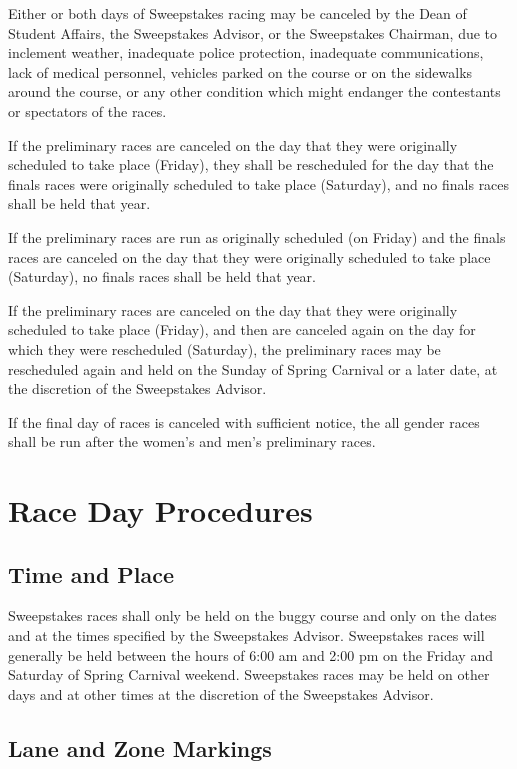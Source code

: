	Either or both days of Sweepstakes racing may be canceled by the Dean of Student Affairs, the Sweepstakes Advisor, or the Sweepstakes Chairman, due to inclement weather, inadequate police protection, inadequate communications, lack of medical personnel, vehicles parked on the course or on the sidewalks around the course, or any other condition which might endanger the contestants or spectators of the races.

	If the preliminary races are canceled on the day that they were originally scheduled to take place (Friday), they shall be rescheduled for the day that the finals races were originally scheduled to take place (Saturday), and no finals races shall be held that year.

	If the preliminary races are run as originally scheduled (on Friday) and the finals races are canceled on the day that they were originally scheduled to take place (Saturday), no finals races shall be held that year.

	If the preliminary races are canceled on the day that they were originally scheduled to take place (Friday), and then are canceled again on the day for which they were rescheduled (Saturday), the preliminary races may be rescheduled again and held on the Sunday of Spring Carnival or a later date, at the discretion of the Sweepstakes Advisor.

	If the final day of races is canceled with sufficient notice, the all gender races shall be run after the women's and men's preliminary races.

\section{Race Day Procedures}

\subsection{Time and Place}

	Sweepstakes races shall only be held on the buggy course and only on the dates and at the times specified by the Sweepstakes Advisor. Sweepstakes races will generally be held between the hours of 6:00 am and 2:00 pm on the Friday and Saturday of Spring Carnival weekend. Sweepstakes races may be held on other days and at other times at the discretion of the Sweepstakes Advisor.

\subsection{Lane and Zone Markings}
\label{subsec:Lanes}

